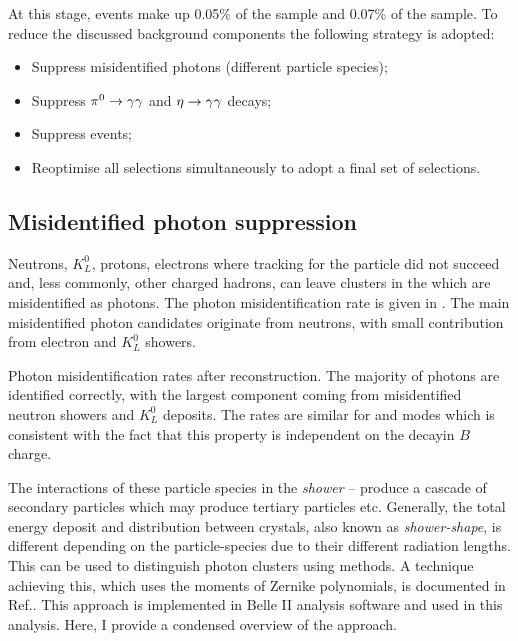 At this stage, \BtoXsgamma events make up 0.05\% of the \FEI \Bp sample and 0.07\% of the \FEI \Bz sample.
To reduce the discussed background components the following strategy is adopted:
\begin{itemize}
    \item Suppress misidentified photons (different particle species);
    \item Suppress $\pi^0\rightarrow\gamma\gamma$ and $\eta\rightarrow\gamma\gamma$ decays;
    \item Suppress \epem\ra\qqbar events;
    \item Reoptimise all selections simultaneously to adopt a final set of selections.
\end{itemize}

\subsection{Misidentified photon suppression}\label{sec:selection_clusZMVA}

Neutrons, $K_L^0$, protons, electrons where tracking for the particle did not succeed and, less commonly, other charged hadrons, can leave clusters in the \ECL which are misidentified as photons.
The photon misidentification rate is given in .
The main misidentified photon candidates originate from neutrons, with small contribution from electron and $K_L^0$ showers.

\begin{table}[htbp!]
    \centering
    \caption{\label{tab:misidentified_photons} Photon misidentification rates after reconstruction.
    The majority of photons are identified correctly, with the largest component coming from misidentified neutron showers and $K_L^0$ deposits.
    The rates are similar for \FEI \Bp and \Bz modes which is consistent with the fact that this property is independent on the decayin $B$ charge.}
    
\end{table}

The interactions of these particle species in the \ECL \textit{shower} -- produce a cascade of secondary particles which may produce tertiary particles etc.
Generally, the total energy deposit and distribution between \ECL crystals, also known as \textit{shower-shape}, is different depending on the particle-species due to their different radiation lengths.
This can be used to distinguish photon clusters using \MVA methods.
A technique achieving this, which uses the moments of Zernike polynomials, is documented in Ref.\cite{Hershenhorn:2468}.
This approach is implemented in Belle II analysis software and used in this analysis.
Here, I provide a condensed overview of the approach.

